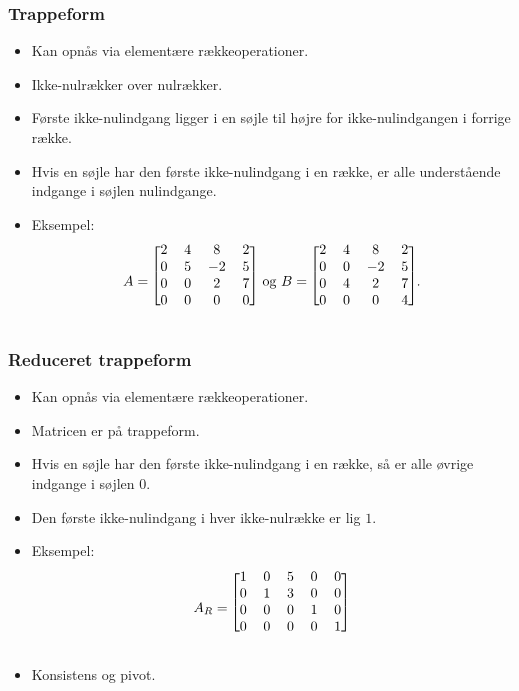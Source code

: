 \begin{frame}
\frametitle{Trappeform}
\begin{itemize}
\item Kan opnås via elementære rækkeoperationer. 
\item Ikke-nulrækker over nulrækker. 
\item Første ikke-nulindgang ligger i en søjle til højre for ikke-nulindgangen i forrige række. 
\item Hvis en søjle har den første ikke-nulindgang i en række, er alle understående indgange i søjlen nulindgange. 
\item Eksempel: 
\begin{align*}
A=
\begin{blockarray}{cccc}
\begin{block}{[cccc]}
2 & 4 & 8 & 2\\
0 & 5 & -2 & 5\\
0 & 0 & 2 & 7\\
0 & 0 & 0 & 0\\
\end{block}
\end{blockarray}
\text{ og }
B=
\begin{blockarray}{cccc}
\begin{block}{[cccc]}
2 & 4 & 8 & 2\\
0 & 0 & -2 & 5\\
0 & 4 & 2 & 7\\
0 & 0 & 0 & 4\\
\end{block}
\end{blockarray}.
\end{align*}
\end{itemize}
\end{frame}
\begin{frame}
\frametitle{Reduceret trappeform}
\begin{itemize}
\item Kan opnås via elementære rækkeoperationer. 
\item Matricen er på trappeform.
\item Hvis en søjle har den første ikke-nulindgang i en række, så er alle øvrige indgange i søjlen $0$.
\item Den første ikke-nulindgang i hver ikke-nulrække er lig $1$. 
\item Eksempel: 
\begin{align*}
A_R=
\begin{blockarray}{ccccc}
\begin{block}{[ccccc]}
1 & 0 & 5 & 0 & 0\\
0 & 1 & 3 & 0 & 0\\
0 & 0 & 0 & 1 & 0\\
0 & 0 & 0 & 0 & 1\\
\end{block}
\end{blockarray}
\end{align*}
\item Konsistens og pivot. 
\end{itemize}
\end{frame}
